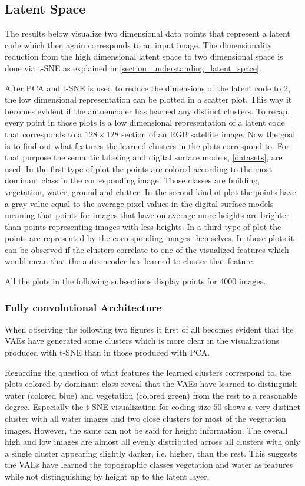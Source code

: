 \subsection{Latent Space} \label{latent_space_experiments}

The results below visualize two dimensional data points that represent a latent code which then again corresponds
to an input image. The dimensionality reduction from the high dimensional latent space to two dimensional space
is done via t-SNE as  explained in \autoref{section_understanding_latent_space}.

After PCA and t-SNE is used to reduce the dimensions of the latent code to 2, the low dimensional representation can be
plotted in a scatter plot. This way it becomes evident if the autoencoder has learned any distinct clusters.
To recap, every point in those plots is a low dimensional representation of a latent code that corresponds to
a $128 \times 128$ section of an RGB satellite image. 
Now the goal is to find out what features the learned clusters in the plots correspond to. For that purpose the
semantic labeling and digital surface models, \autoref{datasets}, are used. In the first type of plot the points
are colored according to the most dominant class in the corresponding image. Those classes are building, vegetation,
water, ground and clutter. In the second kind of plot the points have a gray value equal to the average pixel
values in the digital surface models meaning that points for images that have on average more heights are brighter
than points representing images with less heights.
In a third type of plot the points are represented by the corresponding images themselves.
In those plots it can be observed if the clusters correlate to one of the visualized features which would mean that
the autoencoder has learned to cluster that feature.

All the plots in the following subsections display points for $4000$ images.

\subsubsection{Fully convolutional Architecture}
When observing the following two figures it first of all becomes evident that the VAEs have generated some clusters
which is more clear in the visualizations produced with t-SNE than in those produced with PCA.

Regarding the question of what features the learned clusters correspond to, the plots colored by dominant class
reveal that the VAEs have learned to distinguish water (colored blue) and vegetation (colored green) from the rest 
to a reasonable degree. Especially the t-SNE visualization for coding size $50$ shows a very distinct cluster
with all water images and two close clusters for most of the vegetation images.
However, the same can not be said for height information. The overall high and low images are almost all 
evenly distributed across all clusters with only a single cluster appearing slightly darker, i.e. higher, than the
rest. This suggests the VAEs have learned the topographic classes vegetation and water as features while not 
distinguishing by height up to the latent layer. 


